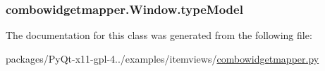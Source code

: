 \subsubsection[{type\+Model}]{\setlength{\rightskip}{0pt plus 5cm}combowidgetmapper.\+Window.\+type\+Model}\label{classcombowidgetmapper_1_1Window_a0963133d54491939e188fe51bbcefd3a}


The documentation for this class was generated from the following file\+:\begin{DoxyCompactItemize}
\item 
packages/\+Py\+Qt-\/x11-\/gpl-\/4../examples/itemviews/\hyperlink{combowidgetmapper_8py}{combowidgetmapper.\+py}\end{DoxyCompactItemize}
